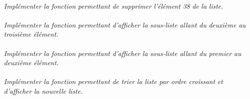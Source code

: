\documentclass[11pt,oneside]{article}
\begin{document}
\paragraph{}
\textit{Implémenter la fonction permettant de supprimer l'élément 38 de la liste.}

\paragraph{}
\textit{Implémenter la fonction permettant d'afficher la sous-liste allant du deuxième au troisième élément.}

\paragraph{}
\textit{Implémenter la fonction permettant d'afficher la sous-liste allant du premier au deuxième élément.}

\paragraph{}
\textit{Implémenter la fonction permettant de trier la liste par ordre croissant et d'afficher la nouvelle liste.}
\end{document}
